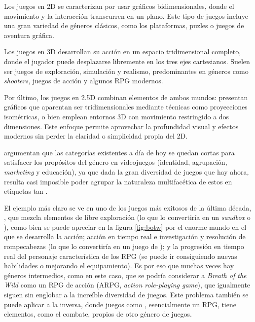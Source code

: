 \smallskip

Los juegos en 2D se caracterizan por usar gráficos bidimensionales, donde el movimiento y la interacción transcurren en un plano. Este tipo de juegos incluye una gran variedad de géneros clásicos, como los plataformas, puzles o juegos de aventura gráfica.

\smallskip

Los juegos en 3D desarrollan su acción en un espacio tridimensional completo, donde el jugador puede desplazarse libremente en los tres ejes cartesianos. Suelen ser juegos de exploración, simulación y realismo, predominantes en géneros como \textit{shooters}, juegos de acción y algunos RPG modernos.

\smallskip

Por último, los juegos en 2.5D combinan elementos de ambos mundos: presentan gráficos que aparentan ser tridimensionales mediante técnicas como proyecciones isométricas, o bien emplean entornos 3D con movimiento restringido a dos dimensiones. Este enfoque permite aprovechar la profundidad visual y efectos modernos sin perder la claridad o simplicidad propia del 2D.

\medskip


\cite{FailGeneros} argumentan que las categorías existentes a día de hoy se quedan cortas para satisfacer los propósitos del género en videojuegos (identidad, agrupación, \textit{marketing} y educación), ya que dada la gran diversidad de juegos que hay ahora, resulta casi imposible poder agrupar la naturaleza multifacética de estos en etiquetas tan .

\smallskip

El ejemplo más claro se ve en uno de los juegos más exitosos de la última década, , que mezcla elementos de libre exploración (lo que lo convertiría en un \textit{sandbox} o ), como bien se puede apreciar en la figura \ref{fig:botw} por el enorme mundo en el que se desarrolla la acción; acción en tiempo real e investigación y resolución de rompecabezas (lo que lo convertiría en un juego de ); y la progresión en tiempo real del personaje característica de los RPG (se puede ir consiguiendo nuevas habilidades o mejorando el equipamiento). Es por eso que muchas veces hay géneros intermedios, como en este caso, que se podría considerar a \textit{Breath of the Wild} como un RPG de acción (ARPG, \textit{action role-playing game}), que igualmente siguen sin englobar a la increíble diversidad de juegos. Este problema también se puede aplicar a la inversa, donde juegos como , esencialmente un RPG, tiene elementos, como el combate, propios de otro género de juegos.

